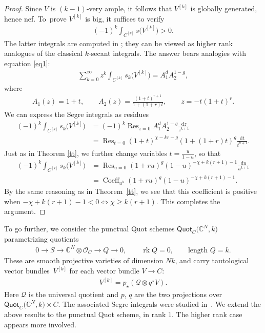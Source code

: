 \documentclass[10pt,a4paper]{amsart}
\numberwithin{equation}{section}
\newcommand{\rk}{\operatorname{rk}}
\begin{document}
\begin{proof}
Since $V$ is $(k-1)$-very ample, it follows that $V^{[k]}$ is globally generated, hence nef. To~prove $V^{[k]}$ is big, it suffices to verify
\begin{gather*}
(-1)^k \int_{C^{[k]}} s\big(V^{[k]}\big)>0.
\end{gather*}
The latter integrals are computed in \cite[Theorem 2]{MOP1}; they can be viewed as higher rank analogues of the classical $k$-secant integrals. The answer bears analogies with equation \eqref{eq1}:
\begin{gather*}
\sum_{k=0}^{\infty} z^k \int_{C^{[k]}} s_{k} \big(V^{[k]}\big) =A_1^{d} A_2^{1-g},
\end{gather*}
where
\begin{gather*}
A_1(z)=1+t, \qquad A_2(z)=\frac{(1+t)^{r+1}}{1+(1+r)t}, \qquad z=-t(1+t)^r.
\end{gather*}
We can express the Segre integrals as residues
\begin{align*}
(-1)^k \int_{C^{[k]}} s_{k} \big(V^{[k]}\big)&=(-1)^k \operatorname{Res}_{z=0} A_1^d A_2^{1-g} \frac{\mathrm dz}{z^{k+1}}
\\
&=\operatorname{Res}_{t=0} (1+t)^{\chi - kr - g} (1+(1+r)t)^{g} \frac{\mathrm dt}{t^{k+1}}.
\end{align*}
Just as in Theorem \ref{tt}, we further change variables $t=\frac{u}{1-u}$, so that
\begin{align*}
(-1)^k \int_{C^{[k]}} s_{k} \big(V^{[k]}\big)&=\operatorname{Res}_{u=0} (1+ru)^{g} (1-u)^{-\chi+k(r+1)-1} \frac{\mathrm du}{u^{k+1}}
\\
&= \operatorname{Coeff}_{u^k} (1+ru)^{g} (1-u)^{-\chi+k(r+1)-1}.
\end{align*}
By the same reasoning as in Theorem~\ref{tt}, we see that this coefficient is positive when $-\chi+k(r+1)-1<0\iff \chi\geq k(r+1)$. This completes the argument.
\end{proof}

To go further, we consider the punctual Quot schemes $\mathsf {Quot}_C\big(\mathbb C^N, k\big)$ parametrizing quotients
\begin{gather*}
0\to S\to \mathbb C^N\otimes \mathcal O_C\to Q\to 0, \qquad \rk Q=0, \qquad \text{length }Q=k.
\end{gather*}
These are smooth projective varieties of dimension $Nk$, and carry tautological vector bundles~$V^{[k]}$ for each vector bundle $V\to C$:
\begin{gather*}
V^{[k]}=p_{\star} (\mathcal Q\otimes q^{\star} V).
\end{gather*}
Here $\mathcal Q$ is the universal quotient and $p$, $q$ are the two projections over $\mathsf{Quot}_C\big(\mathbb C^N, k\big)\times C$.
The associated Segre integrals were studied in~\cite{OP2021}. We extend the above results to the punctual Quot scheme, in rank $1$. The higher rank case appears more involved.
\end{document}
